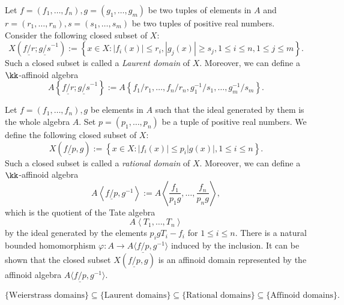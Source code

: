     \begin{construction}\label{constr:Laurent_domain}
        Let \(f=(f_1,\ldots,f_n),g = (g_1,\ldots,g_m)\) be two tuples of elements in \(A\) and \(r=(r_1,\ldots,r_n),s=(s_1,\ldots,s_m)\) be two tuples of positive real numbers.
        Consider the following closed subset of \(X\):
        \[ X\left(\underline{f/r};\underline{g/s}^{-1}\right) := \left\{ x \in X \colon |f_i(x)| \le r_i, |g_j(x)| \ge s_j, 1 \le i \le n, 1 \le j \le m \right\}. \]
        Such a closed subset is called a \emph{Laurent domain} of \(X\).
        Moreover, we can define a \(\kk\)-affinoid algebra
        \[ A\left\{ \underline{f/r};\underline{g/s}^{-1} \right\} := A\left\{ f_1/r_1,\ldots,f_n/r_n,g_1^{-1}/s_1,\ldots,g_m^{-1}/s_m \right\}. \]
    \end{construction}

    \begin{construction}\label{constr:rational_domain}
        Let \(f=(f_1,\ldots,f_n),g\) be elements in \(A\) such that the ideal generated by them is the whole algebra \(A\).
        Set \(p=(p_1,\ldots,p_n)\) be a tuple of positive real numbers.
        We define the following closed subset of \(X\):
        \[ X\left(\underline{f/p},g\right) := \left\{ x \in X \colon |f_i(x)| \le p_i |g(x)|, 1 \le i \le n \right\}. \]
        Such a closed subset is called a \emph{rational domain} of \(X\).
        Moreover, we can define a \(\kk\)-affinoid algebra
        \[ A\left\langle \underline{f/p},g^{-1} \right\rangle := A\left\langle \frac{f_1}{p_1 g},\ldots,\frac{f_n}{p_n g} \right\rangle, \]
        which is the quotient of the Tate algebra
        \[ A\left\langle T_1,\ldots,T_n \right\rangle \]
        by the ideal generated by the elements \(p_i g T_i - f_i\) for \(1 \le i \le n\).
        There is a natural bounded homomorphism \(\varphi: A \to A\langle \underline{f/p},g^{-1} \rangle\) induced by the inclusion.
        It can be shown that the closed subset \(X(\underline{f/p},g)\) is an affinoid domain represented by the affinoid algebra \(A\langle \underline{f/p},g^{-1} \rangle\).
    \end{construction}

    \[ \{\text{Weierstrass domains}\} \subseteq \{\text{Laurent domains}\} \subseteq \{\text{Rational domains}\} \subseteq \{\text{Affinoid domains}\}. \]

